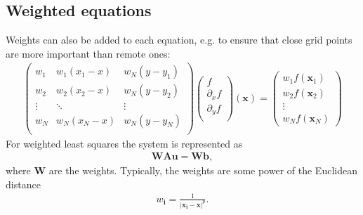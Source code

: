 \documentclass[letterpaper,10pt,english]{sphinxmanual}
\begin{document}
\subsection{Weighted equations}
\label{\detokenize{Utilities/LeastSquares:weighted-equations}}
\sphinxAtStartPar
Weights can also be added to each equation, e.g. to ensure that close grid points are more important than remote ones:
\begin{equation*}
\begin{split}\begin{pmatrix}
w_1 & w_1(x_1 - x) & w_N(y - y_1) \\
w_2 & w_2(x_2 - x) & w_N(y - y_2) \\
\vdots & \ddots & \vdots \\
w_N & w_N(x_N - x) & w_N(y - y_N) \\
\end{pmatrix}
\begin{pmatrix}
f            \\
\partial_x f \\
\partial_y f \\
\end{pmatrix}(\mathbf{x})
=
\begin{pmatrix}
w_1f(\mathbf{x}_1) \\
w_2f(\mathbf{x}_2) \\
\vdots \\
w_Nf(\mathbf{x}_N)
\end{pmatrix}\end{split}
\end{equation*}
\sphinxAtStartPar
For weighted least squares the system is represented as
\begin{equation*}
\begin{split}\mathbf{W}\mathbf{A}\mathbf{u} = \mathbf{W}\mathbf{b},\end{split}
\end{equation*}
\sphinxAtStartPar
where \(\mathbf{W}\) are the weights.
Typically, the weights are some power of the Euclidean distance
\begin{equation*}
\begin{split}w_{\mathbf{i}} = \frac{1}{\left|\mathbf{x}_{\mathbf{i}} - \mathbf{x}\right|^p}.\end{split}
\end{equation*}
\end{document}
